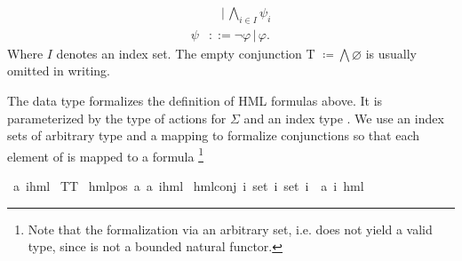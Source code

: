 \begin{isabellebody}
\begin{isamarkuptext}
\begin{align*}
            &\quad | \, \bigwedge_{i \in I} \psi_i \\
    \psi &::= \neg \varphi \, | \, \varphi.
\end{align*}
Where $I$ denotes an index set. The empty conjunction \textsf{T} $\coloneqq \bigwedge\varnothing$ is usually omitted in writing.%
\end{isamarkuptext}\isamarkuptrue%
%
\begin{isamarkuptext}%
The data type  formalizes the definition of HML formulas above. It is parameterized by the type of actions  for $\Sigma$
and an index type . We use an index sets of arbitrary type  and a mapping  to formalize
conjunctions so that each element of  is mapped to a formula%
\footnote{Note that the formalization via an arbitrary set, i.e.  does not yield a valid type, since  is not a bounded natural functor.}%
\end{isamarkuptext}\isamarkuptrue%
\isamarkupfalse%
\ {\isacharparenleft}{\kern0pt}{\isacharprime}{\kern0pt}a{\isacharcomma}{\kern0pt}\ {\isacharprime}{\kern0pt}i{\isacharparenright}{\kern0pt}hml\ {\isacharequal}{\kern0pt}\isanewline
TT\ {\isacharbar}{\kern0pt}\isanewline
hml{\isacharunderscore}{\kern0pt}pos\ {\isacartoucheopen}{\isacharprime}{\kern0pt}a{\isacartoucheclose}\ {\isacartoucheopen}{\isacharparenleft}{\kern0pt}{\isacharprime}{\kern0pt}a{\isacharcomma}{\kern0pt}\ {\isacharprime}{\kern0pt}i{\isacharparenright}{\kern0pt}hml{\isacartoucheclose}\ {\isacharbar}{\kern0pt}\isanewline
hml{\isacharunderscore}{\kern0pt}conj\ {\isacartoucheopen}{\isacharprime}{\kern0pt}i\ set{\isacartoucheclose}\ {\isacartoucheopen}{\isacharprime}{\kern0pt}i\ set{\isacartoucheclose}\ {\isacartoucheopen}{\isacharprime}{\kern0pt}i\ {\isasymRightarrow}\ {\isacharparenleft}{\kern0pt}{\isacharprime}{\kern0pt}a{\isacharcomma}{\kern0pt}\ {\isacharprime}{\kern0pt}i{\isacharparenright}{\kern0pt}\ hml{\isacartoucheclose}%

\end{isabellebody}
